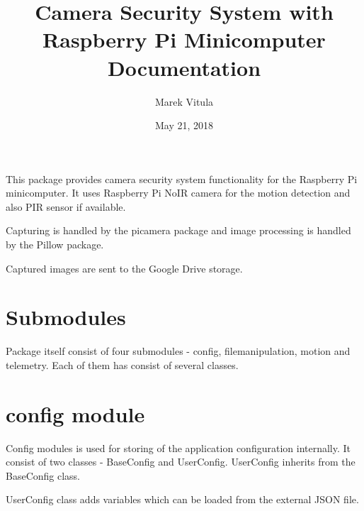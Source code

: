 \documentclass[letterpaper,10pt,english,openany]{sphinxmanual}
\title{Camera Security System with Raspberry Pi Minicomputer Documentation}
\date{May 21, 2018}
\author{Marek Vitula}
\begin{document}
\maketitle
\tableofcontents
{}\label{rpicameramon::doc}


This package provides camera security system functionality for the Raspberry Pi minicomputer.
It uses Raspberry Pi NoIR camera for the motion detection and also PIR sensor if available.

Capturing is handled by the picamera package and image processing is handled by the Pillow package.

Captured images are sent to the Google Drive storage.


\chapter{Submodules}
\label{rpicameramon:submodules}\label{rpicameramon:rpicameramon-package}
Package itself consist of four submodules - config, filemanipulation, motion and telemetry.
Each of them has consist of several classes.


\chapter{config module}
\label{rpicameramon:config-module}
Config modules is used for storing of the application configuration internally.
It consist of two classes - BaseConfig and UserConfig. UserConfig inherits from the BaseConfig class.

UserConfig class adds variables which can be loaded from the external JSON file.
\label{rpicameramon:module-rpicameramon.config}
\end{document}

